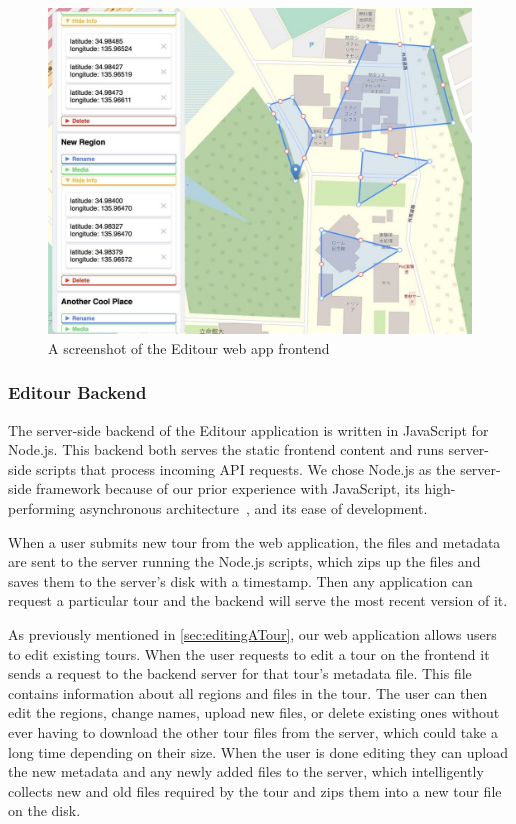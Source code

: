 \documentclass[a4paper, 10pt, american, titlepage]{article}
\begin{document}
\begin{figure}[h]
	\centering
	\includegraphics[width=\textwidth]{editour.jpg}
	\caption{A screenshot of the Editour web app frontend}
	\label{fig:editour}
\end{figure}

\subsubsection{Editour Backend}
\label{sec:editourBackend}

The server-side backend of the Editour application is written in JavaScript for
Node.js. This backend both serves the static frontend content and runs
server-side scripts that process incoming API requests.  We chose Node.js as the
server-side framework because of our prior experience with JavaScript, its
high-performing asynchronous architecture~\autocite{orsini2013}, and its ease of
development.

When a user submits new tour from the web application, the files and metadata
are sent to the server running the Node.js scripts, which zips up the files and
saves them to the server's disk with a timestamp. Then any application can
request a particular tour and the backend will serve the most recent version of
it.

As previously mentioned in \ref{sec:editingATour}, our web application allows
users to edit existing tours. When the user requests to edit a tour on the
frontend it sends a request to the backend server for that tour's metadata
file. This file contains information about all regions and files in the tour.
The user can then edit the regions, change names, upload new files, or delete
existing ones without ever having to download the other tour files from the
server, which could take a long time depending on their size. When the user is
done editing they can upload the new metadata and any newly added files to the
server, which intelligently collects new and old files required by the tour and
zips them into a new tour file on the disk.
\end{document}
